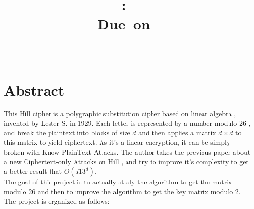 \documentclass{article}
\title{
\vspace{2in}
\textmd{\textbf{\hmwkClass:\ \hmwkTitle}}\\
\normalsize\vspace{0.1in}\small{Due\ on\ \hmwkDueDate}\\
\vspace{0.1in}\large{\textit{\hmwkClassInstructor\ \hmwkClassTime}}
\vspace{3in}
}
\author{\textbf{\hmwkAuthorName}}
\date{} %
\begin{document}
\maketitle


\newpage
\section{Abstract}
This Hill cipher is a polygraphic substitution cipher based on linear algebra , invented by 
Lester S. in 1929. Each letter is represented by a number modulo 26 , and break the plaintext into blocks of size $d$ and then applies a matrix $d \times d $ to this matrix to yield ciphertext. As it's a linear encryption, it can be simply broken with Know PlainText Attacks.
The author takes the previous paper about a new Ciphertext-only Attacks on Hill , and try to improve it's complexity to get a better result that $O(d13^d)$.\\
${}$\hspace{1em}The goal of this project is to actually study the algorithm to get the matrix modulo 26 and then to improve the algorithm to get the key matrix modulo 2.\\
${}$\hspace{1em}The project is organized as follows:
\newpage



\newpage
\tableofcontents
\newpage






\end{document}
